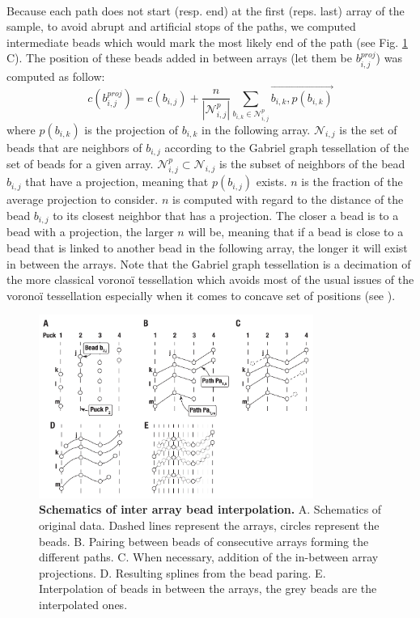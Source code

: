 \documentclass[10pt,a4paper]{article}
\begin{document}
\paragraph{}Because each path does not start (resp. end) at the first (reps. last) array of the sample, to avoid abrupt and artificial stops of the paths, we computed intermediate beads which would mark the most likely end of the path (see Fig. \ref{fig:interp} C). The position of these beads added in between arrays (let them be \(b^{proj}_{i,j}\)) was computed as follow:
\begin{equation}\label{eq:proj}
c(b^{proj}_{i,j})=c({b_{i,j}})+\frac{n}{|\mathcal{N}^p_{i,j}|}\sum_{b_{i,k}\in \mathcal{N}^p_{i,j}}\overrightarrow{b_{i,k},p(b_{i,k})}
\end{equation}
where \(p(b_{i,k})\) is the projection of \(b_{i,k}\) in the following array. \(\mathcal{N}_{i,j}\) is the set of beads that are neighbors of \(b_{i,j}\) according to the Gabriel graph tessellation of the set of beads for a given array.
\(\mathcal{N} ^p_{i,j}\subset \mathcal{N}_{i,j}\) is the subset of neighbors of the bead \(b_{i,j}\) that have a projection, meaning that \(p(b_{i,j})\) exists.
\(n\) is the fraction of the average projection to consider. \(n\) is computed with regard to the distance of the bead \(b_{i,j}\) to its closest neighbor that has a projection.
The closer a bead is to a bead with a projection, the larger \(n\) will be, meaning that if a bead is close to a bead that is linked to another bead in the following array, the longer it will exist in between the arrays.
Note that the Gabriel graph tessellation is a decimation of the more classical vorono\"i tessellation which avoids most of the usual issues of the vorono\"i tessellation especially when it comes to concave set of positions (see \cite{mcdole:2018}).
\begin{figure}
\center
\includegraphics[width=0.8\textwidth]{figures/interpolation}
\caption{\textbf{Schematics of inter array bead interpolation.} A. Schematics of original data. Dashed lines represent the arrays, circles represent the beads. B. Pairing between beads of consecutive arrays forming the different paths. C. When necessary, addition of the in-between array projections. D. Resulting splines from the bead paring. E. Interpolation of beads in between the arrays, the grey beads are the interpolated ones.}\label{fig:interp}
\end{figure}
\end{document}
